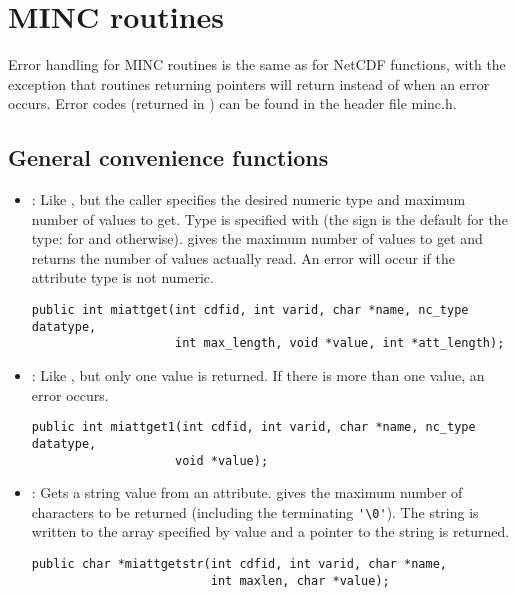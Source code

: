 \section{MINC routines}

Error handling for MINC routines is the same as for NetCDF functions,
with the exception that routines returning pointers will return
 instead of  when an error occurs. Error
codes (returned in ) can be found in the header file
minc.h.

\subsection{General convenience functions}

\begin{itemize}

\item {} : Like , but the caller specifies
the desired numeric type and maximum number of values to get. Type is
specified with  (the sign is the default for the type:
 for  and 
otherwise).  gives the maximum number of values to
get and  returns the number of values actually read.
An error will occur if the attribute type is not numeric.
\begin{verbatim}
public int miattget(int cdfid, int varid, char *name, nc_type datatype,
                    int max_length, void *value, int *att_length);
\end{verbatim}

\item {} : Like , but only one value is
returned. If there is more than one value, an error occurs.
\begin{verbatim}
public int miattget1(int cdfid, int varid, char *name, nc_type datatype,
                    void *value);
\end{verbatim}

\item {} : Gets a string value from an attribute.
 gives the maximum number of characters to be returned
(including the terminating \verb+'\0'+). The string is written to the array
specified by value and a pointer to the string is returned.
\begin{verbatim}
public char *miattgetstr(int cdfid, int varid, char *name, 
                         int maxlen, char *value);
\end{verbatim}


\end{itemize}
